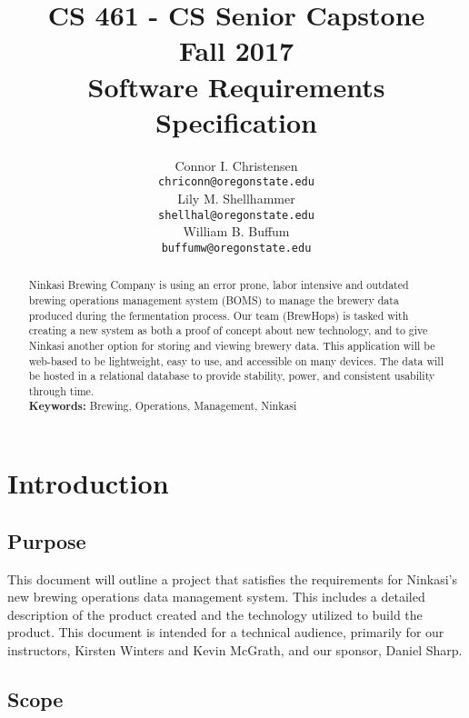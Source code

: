 \documentclass[draftclsnofoot,onecolumn,letterpaper,10pt,compsoc]{IEEEtran}
\title{CS 461 - CS Senior Capstone
	\\Fall 2017
	\\Software Requirements Specification
}
\author{
	Connor I. Christensen \\
	\texttt{chriconn@oregonstate.edu}
	\\
	Lily M. Shellhammer \\
	\texttt{shellhal@oregonstate.edu}
	\\
	William B. Buffum \\
	\texttt{buffumw@oregonstate.edu}
}
\begin{document}
\begin{titlingpage}
    \maketitle
    \begin{abstract}
			Ninkasi Brewing Company is using an error prone, labor intensive and outdated brewing operations management system (BOMS) to manage the brewery data produced during the fermentation process.
			Our team (BrewHops) is tasked with creating a new system as both a proof of concept about new technology, and to give Ninkasi another option for storing and viewing brewery data.
			This application will be web-based to be lightweight, easy to use, and accessible on many devices.
			The data will be hosted in a relational database to provide stability, power, and consistent usability through time.
			\\
			\textbf{Keywords:} Brewing, Operations, Management, Ninkasi
    \end{abstract}
		\pagebreak
		\tableofcontents
\end{titlingpage}

\section{Introduction}
	\subsection{Purpose}
		This document will outline a project that satisfies the requirements for Ninkasi's new brewing operations data management system.
		This includes a detailed description of the product created and the technology utilized to build the product.
		This document is intended for a technical audience, primarily for our instructors, Kirsten Winters and Kevin McGrath, and our sponsor, Daniel Sharp.

	\subsection{Scope}
\end{document}
